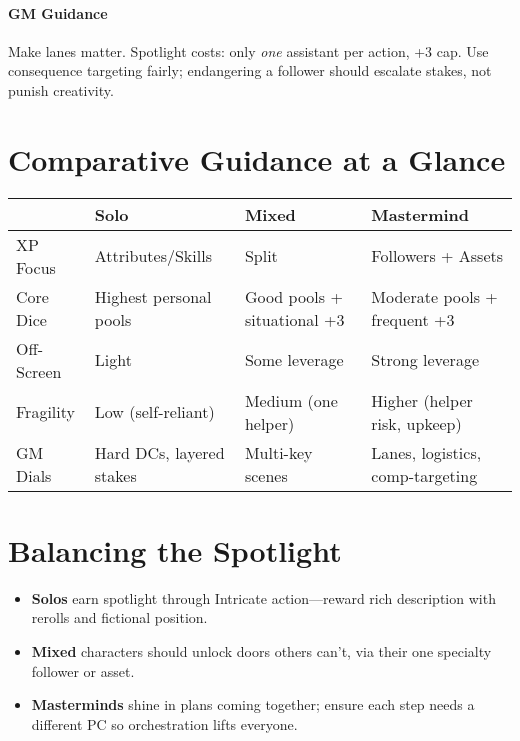 \documentclass[12pt]{book}
\begin{document}
\paragraph{GM Guidance} Make lanes matter. Spotlight costs: only \emph{one} assistant per action, +3 cap. Use consequence targeting fairly; endangering a follower should escalate stakes, not punish creativity.

\section{Comparative Guidance at a Glance}

\begin{center}
\begin{tabular}{p{3.2cm} p{3.2cm} p{3.2cm} p{3.2cm}}
\toprule
 & \textbf{Solo} & \textbf{Mixed} & \textbf{Mastermind} \\
\midrule
XP Focus & Attributes/Skills & Split & Followers + Assets \\
Core Dice & Highest personal pools & Good pools + situational +3 & Moderate pools + frequent +3 \\
Off-Screen & Light & Some leverage & Strong leverage \\
Fragility & Low (self-reliant) & Medium (one helper) & Higher (helper risk, upkeep) \\
GM Dials & Hard DCs, layered stakes & Multi-key scenes & Lanes, logistics, comp-targeting \\
\bottomrule
\end{tabular}
\end{center}

\section{Balancing the Spotlight}
\begin{itemize}
  \item \textbf{Solos} earn spotlight through Intricate action—reward rich description with rerolls and fictional position.
  \item \textbf{Mixed} characters should unlock doors others can’t, via their one specialty follower or asset.
  \item \textbf{Masterminds} shine in plans coming together; ensure each step needs a different PC so orchestration lifts everyone.
\end{itemize}
\end{document}
